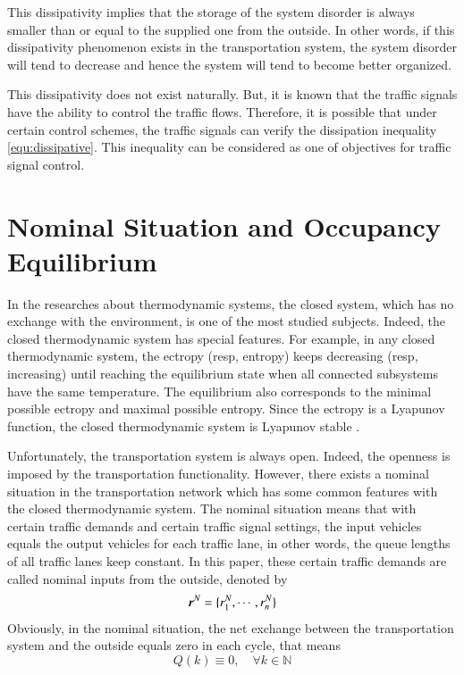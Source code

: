 \documentclass[preprint,authoryear,12pt]{elsarticle}
\renewcommand{\vec}[1]{\mbox{\boldmath$#1$}}
\begin{document}
This dissipativity implies that the storage of the system disorder is always smaller than or equal to the supplied one from the outside. In other words, if this dissipativity phenomenon exists in the transportation system, the system disorder will tend to decrease and hence the system will tend to become better organized.

This dissipativity does not exist naturally. But, it is known that the traffic signals have the ability to control the traffic flows. Therefore, it is possible that under certain control schemes, the traffic signals can verify the dissipation inequality \eqref{equ:dissipative}. This inequality can be considered as one of objectives for traffic signal control.

\section{Nominal Situation and Occupancy Equilibrium}\label{sec:nominal}

In the researches about thermodynamic systems, the closed system, which has no exchange with the environment, is one of the most studied subjects. Indeed, the closed thermodynamic system has special features. For example, in any closed thermodynamic system, the ectropy (resp, entropy) keeps decreasing (resp, increasing) until reaching the equilibrium state when all connected subsystems have the same temperature. The equilibrium also corresponds to the minimal possible ectropy and maximal possible entropy. Since the ectropy is a Lyapunov function, the closed thermodynamic system is Lyapunov stable \citep{haddad_thermodynamic_2005}.

Unfortunately, the transportation system is always open. Indeed, the openness is imposed by the transportation functionality. However, there exists a nominal situation \citep{diakaki_multivariable_2002} in the transportation network which has some common features with the closed thermodynamic system. The nominal situation means that with certain traffic demands and certain traffic signal settings, the input vehicles equals the output vehicles for each traffic lane, in other words, the queue lengths of all traffic lanes keep constant. In this paper, these certain traffic demands are called nominal inputs from the outside, denoted by
$$\vec{r}^N=\{r_1^N,\cdots,r_n^N\}$$
Obviously, in the nominal situation, the net exchange between the transportation system and the outside equals zero in each cycle, that means
\begin{equation}\label{equ:nominal_exchange}
Q(k)\equiv 0, \quad \forall k\in\mathbb{N}
\end{equation}
\end{document}
